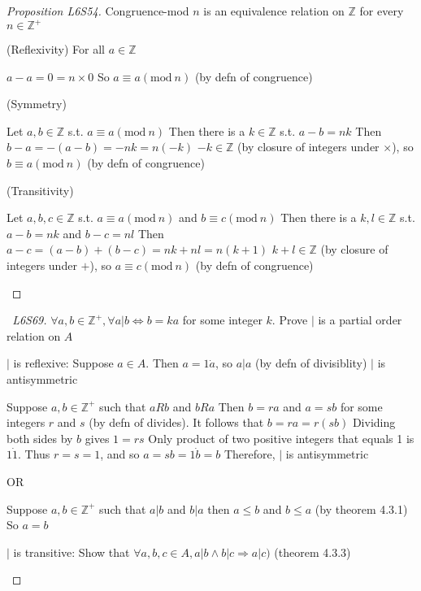 \documentclass[a4paper]{article}
\theoremstyle{definition}
\begin{document}
\begin{proof}[Proposition L6S54] Congruence-mod $n$ is an equivalence relation on $\mathbb{Z}$ for every $n \in \mathbb{Z}^+$
  \begin{numpf*}
    \pfln (Reflexivity) For all $a \in \mathbb{Z}$
    \begin{subpf*}
      \pfln $a - a = 0 = n \times 0$
      \pfln So $a \equiv a (\text{mod}\ n)$ (by defn of congruence)
    \end{subpf*}
    \pfln (Symmetry)
    \begin{subpf*}
      \pfln Let $a, b \in \mathbb{Z}$ s.t. $a \equiv a (\text{mod}\ n)$
      \pfln Then there is a $k \in \mathbb{Z}$ s.t. $a - b = nk$
      \pfln Then $b - a = -(a - b) = -nk = n(-k)$
      \pfln $-k \in \mathbb{Z}$ (by closure of integers under $\times$), so $b \equiv a (\text{mod}\ n)$ (by defn of congruence)
    \end{subpf*}
    \pfln (Transitivity)
    \begin{subpf*}
      \pfln Let $a, b,c \in \mathbb{Z}$ s.t. $a \equiv a (\text{mod}\ n)$ and $b \equiv c (\text{mod}\ n)$
      \pfln Then there is a $k,l \in \mathbb{Z}$ s.t. $a - b = nk$ and $b - c = nl$
      \pfln Then $a - c = (a - b) + (b - c) = nk + nl = n(k + 1)$
      \pfln $k + l \in \mathbb{Z}$ (by closure of integers under $+$), so $a \equiv c (\text{mod}\ n)$ (by defn of congruence)
    \end{subpf*}
  \end{numpf*}
\end{proof}

\begin{proof}[\proofname\ L6S69] $\forall a, b \in \mathbb{Z}^+, \forall a | b \Leftrightarrow b = ka$ for some integer $k$. Prove $|$ is a partial order relation on $A$
  \begin{numpf*}    
    \pfln $|$ is reflexive: Suppose $a \in A$. Then $a = 1 \dot a$, so $a|a$ (by defn of divisiblity)
    \pfln $|$ is antisymmetric
    \begin{subpf*}
      \pfln Suppose $a, b \in \mathbb{Z}^+$ such that $aRb$ and $bRa$
      \pfln Then $b = ra$ and $a = sb$ for some integers $r$ and $s$ (by defn of divides). It follows that $b = ra = r(sb)$
      \pfln Dividing both sides by $b$ gives $1 = rs$
      \pfln Only product of two positive integers that equals 1 is $1 \dot 1$. 
      \pfln Thus $r = s = 1$, and so $a = sb = 1 \dot b = b$
      \pfln Therefore, $|$ is antisymmetric
    \end{subpf*}
    OR
    \begin{subpf*}
      \pfln Suppose $a, b \in \mathbb{Z}^+$ such that $a|b$ and $b|a$
      \pfln then $a \leq b$ and $b \leq a$ (by theorem 4.3.1)
      \pfln So $a = b$
    \end{subpf*}
    \pfln $|$ is transitive: Show that $\forall a, b, c \in A, a|b \land b|c \Rightarrow a |c)$ (theorem 4.3.3)
  \end{numpf*}

\end{proof}
\end{document}
